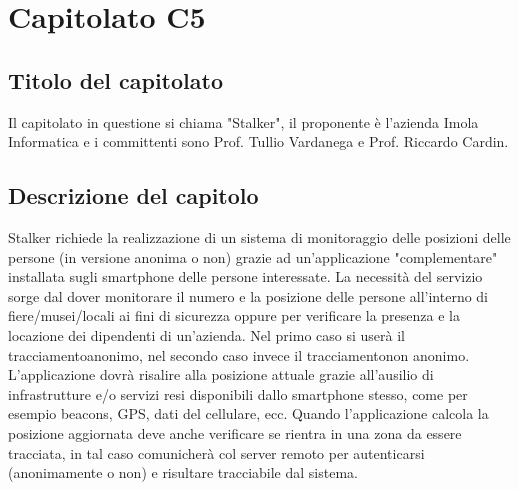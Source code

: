 \section{Capitolato C5}
\subsection{Titolo del capitolato}
Il capitolato in questione si chiama "Stalker", il proponente \`e l'azienda Imola Informatica e i committenti sono Prof. Tullio Vardanega e Prof. Riccardo Cardin.

\subsection{Descrizione del capitolo}
Stalker richiede la realizzazione di un sistema di monitoraggio delle posizioni delle persone (in versione anonima o non) grazie ad un'applicazione "complementare" installata sugli smartphone delle persone interessate. La necessit\`a del servizio sorge dal dover monitorare il numero e la posizione delle persone all'interno di fiere/musei/locali ai fini di sicurezza oppure per verificare la presenza e la locazione dei dipendenti di un'azienda. Nel primo caso si user\`a il tracciamentoanonimo, nel secondo caso invece il tracciamentonon anonimo. L'applicazione dovr\`a risalire alla posizione attuale grazie all'ausilio di infrastrutture e/o servizi resi disponibili dallo smartphone stesso, come per esempio beacons, GPS, dati del cellulare, ecc. Quando l'applicazione calcola la posizione aggiornata deve anche verificare se rientra in una zona da essere tracciata, in tal caso comunicher\`a col server remoto per autenticarsi (anonimamente o non) e risultare tracciabile dal sistema.

